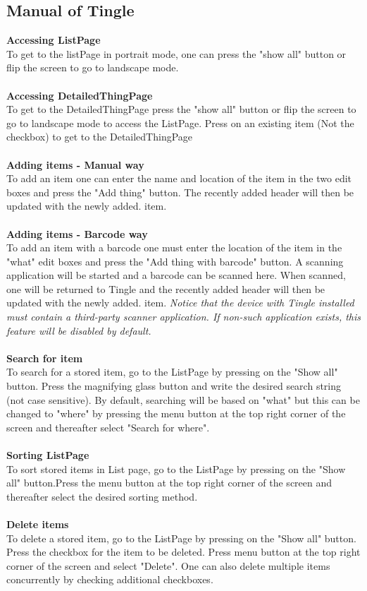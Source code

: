 \documentclass{article}
\begin{document}
\subsection{Manual of Tingle}\label{manual}
\textbf{Accessing ListPage}\\To get to the listPage in portrait mode, one can press the "show all" button or flip the screen to go to landscape mode.\\\\\textbf{Accessing DetailedThingPage}\\To get to the DetailedThingPage press the "show all" button or flip the screen to go to landscape mode to access the ListPage. Press on an existing item (Not the checkbox) to get to the DetailedThingPage\\\\\textbf{Adding items - Manual way}\\To add an item one can enter the name and location of the item in the two edit boxes and press the "Add thing" button. The recently added header will then be updated with the newly added. item.
\\\\\textbf{Adding items - Barcode way}\\To add an item with a barcode one must enter the location of the item in the "what" edit boxes and press the "Add thing with barcode" button. A scanning application will be started and a barcode can be scanned here. When scanned, one will be returned to Tingle and the recently added header will then be updated with the newly added. item. \textit{Notice that the device with Tingle installed must contain a third-party scanner application. If non-such application exists, this feature will be disabled by default.}\\\\\textbf{Search for item}\\To search for a stored item, go to the ListPage by pressing on the "Show all" button. Press the magnifying glass button and write the desired search string (not case sensitive). By default, searching will be based on "what" but this can be changed to "where" by pressing the menu button at the top right corner of the screen and thereafter select "Search for where".\\\\\textbf{Sorting ListPage}\\To sort stored items in List page, go to the ListPage by pressing on the "Show all" button.Press the menu button at the top right corner of the screen and thereafter select the desired sorting method.\\\\\textbf{Delete items}\\To delete a stored item, go to the ListPage by pressing on the "Show all" button. Press the checkbox for the item to be deleted. Press menu button at the top right corner of the screen and select "Delete". One can also delete multiple items concurrently by checking additional checkboxes.
\end{document}
